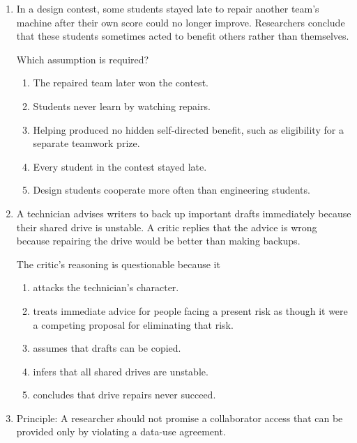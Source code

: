 \begin{enumerate}
\item In a design contest, some students stayed late to repair another team's machine after their own score could no longer improve. Researchers conclude that these students sometimes acted to benefit others rather than themselves.

Which assumption is required?
\begin{enumerate}
\item[(A)] The repaired team later won the contest.
\item[(B)] Students never learn by watching repairs.
\item[(C)] Helping produced no hidden self-directed benefit, such as eligibility for a separate teamwork prize.
\item[(D)] Every student in the contest stayed late.
\item[(E)] Design students cooperate more often than engineering students.
\end{enumerate}

\item A technician advises writers to back up important drafts immediately because their shared drive is unstable. A critic replies that the advice is wrong because repairing the drive would be better than making backups.

The critic's reasoning is questionable because it
\begin{enumerate}
\item[(A)] attacks the technician's character.
\item[(B)] treats immediate advice for people facing a present risk as though it were a competing proposal for eliminating that risk.
\item[(C)] assumes that drafts can be copied.
\item[(D)] infers that all shared drives are unstable.
\item[(E)] concludes that drive repairs never succeed.
\end{enumerate}

\item Principle: A researcher should not promise a collaborator access that can be provided only by violating a data-use agreement.


\end{enumerate}
